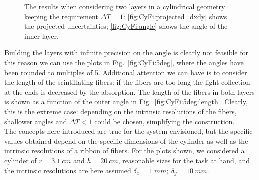 \begin{refsection}
\begin{figure}[ht]
            \hfill
            \caption{The results when considering two layers in a cylindrical geometry keeping the requirement $\Delta T=1$: \ref{fig:CyFi:projected_dxdy} shows the projected uncertainties; \ref{fig:CyFi:angle} shows the angle of the inner layer.}
            \label{fig:CyFi}
        \end{figure}
        
        \noindent
        Building the layers with infinite precision on the angle is clearly not feasible for this reason we can use the plots in Fig.~\ref{fig:CyFi:5deg}, where the angles have been rounded to multiples of \SI{5}{\deg}. 
        Additional attention we can have is to consider the length of the scintillating fibers: if the fibers are too long the light collection at the ends is decreased by the absorption. The length of the fibers in both layers is shown as a function of the outer angle in Fig.~\ref{fig:CyFi:5deg:length}.
        Clearly, this is the extreme case: depending on the intrinsic resolutions of the fibers, shallower angles and $\Delta T<1$ could be chosen, simplifying the construction. \\
        
        \noindent
        The concepts here introduced are true for the system envisioned, but the specific values obtained depend on the specific dimensions of the cylinder as well as the intrinsic resolutions of a ribbon of fibers. 
        For the plots shown, we considered a cylinder of $r=\SI{3.1}{cm}$ and $h=\SI{20}{cm}$, reasonable sizes for the task at hand, and the intrinsic resolutions are here assumed $\delta_x = \SI{1}{mm};\ \delta_y = \SI{10}{mm}$.
        

\end{refsection}

